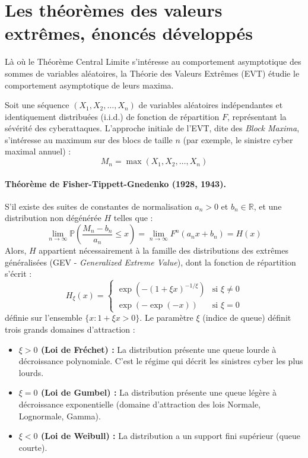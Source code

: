 \section{Les théorèmes des valeurs extrêmes, énoncés développés}
\label{sec:ann-evt}


Là où le Théorème Central Limite s'intéresse au comportement asymptotique des sommes de variables aléatoires, la Théorie des Valeurs Extrêmes (EVT) étudie le comportement asymptotique de leurs maxima.

Soit une séquence $(X_1, X_2, \dots, X_n)$ de variables aléatoires indépendantes et identiquement distribuées (i.i.d.) de fonction de répartition $F$, représentant la sévérité des cyberattaques. L'approche initiale de l'EVT, dite des \textit{Block Maxima}, s'intéresse au maximum sur des blocs de taille $n$ (par exemple, le sinistre cyber maximal annuel) :
\begin{equation}
M_n = \max(X_1, X_2, \dots, X_n)
\end{equation}



\paragraph{Théorème de Fisher-Tippett-Gnedenko (1928, 1943).} S'il existe des suites de constantes de normalisation $a_n > 0$ et $b_n \in \mathbb{R}$, et une distribution non dégénérée $H$ telles que :
\begin{equation}
\lim_{n \to \infty} \mathbb{P}\left( \frac{M_n - b_n}{a_n} \le x \right) = \lim_{n \to \infty} F^n(a_n x + b_n) = H(x)
\end{equation}
Alors, $H$ appartient nécessairement à la famille des distributions des extrêmes généralisées (GEV - \textit{Generalized Extreme Value}), dont la fonction de répartition s'écrit :
\begin{equation}
H_{\xi}(x) =
\begin{cases}
\exp\left(-\left(1 + \xi x \right)^{-1/\xi}\right) & \text{si } \xi \neq 0 \\
\exp\left(-\exp(-x)\right) & \text{si } \xi = 0
\end{cases}
\end{equation}
définie sur l'ensemble $\{x : 1 + \xi x > 0\}$. Le paramètre $\xi$ (indice de queue) définit trois grands domaines d'attraction :
\begin{itemize}
    \item \textbf{$\xi > 0$ (Loi de Fréchet) :} La distribution présente une queue lourde à décroissance polynomiale. C'est le régime qui décrit les sinistres cyber les plus lourds.
    \item \textbf{$\xi = 0$ (Loi de Gumbel) :} La distribution présente une queue légère à décroissance exponentielle (domaine d'attraction des lois Normale, Lognormale, Gamma).
    \item \textbf{$\xi < 0$ (Loi de Weibull) :} La distribution a un support fini supérieur (queue courte).
\end{itemize}






